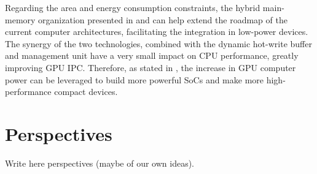 \documentclass[12pt,journal,compsoc]{IEEEtran}
\begin{document}
Regarding the area and energy consumption constraints, the hybrid main-memory organization presented in \cite{PRAM} and \cite{PDRAM} can help extend the roadmap of the current computer architectures, facilitating the integration in low-power devices. The synergy of the two technologies, combined with the dynamic hot-write buffer and management unit have a very small impact on CPU performance, greatly improving GPU IPC. Therefore, as stated in \cite{PRAM}, the increase in GPU computer power can be leveraged to build more powerful SoCs and make more high-performance compact devices.

\section{Perspectives}
Write here perspectives (maybe of our own ideas). 

\ifCLASSOPTIONcompsoc

\ifCLASSOPTIONcaptionsoff
  \newpage
\fi





\newpage

\end{document}
